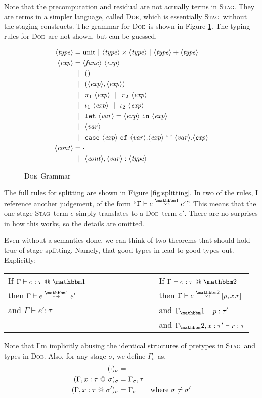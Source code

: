 \documentclass[11pt]{article}
\makeatletter
\newcommand {\type} {\langle\mathit{type}\rangle}
\newcommand {\expr} {\langle\mathit{exp}\rangle}
\newcommand {\var} {\langle\mathit{var}\rangle}
\newcommand {\context} {\langle\mathit{cont}\rangle}
\newcommand {\gbar} {~~|~~}
\newcommand {\bbone} {\mathbbm 1}
\newcommand {\bbtwo} {\mathbbm 2}
\newcommand {\at} {{\tt~@~}}
\newcommand {\letin} [3] {{\tt let}~{#1} = {#2}~{\tt in}~{#3}}
\newcommand {\splito} {\overset{\bbone}\rightsquigarrow}
\newcommand {\splits} {\overset{\bbtwo}\rightsquigarrow}
\newcommand {\wstage} {\textsc{Stag}}
\newcommand {\wostage} {\textsc{Doe}}
\makeatother
\begin{document}
Note that the precomputation and residual are not actually terms in \wstage.  They are terms in a simpler language, called \wostage, which is essentially \wstage~without the staging constructs.  The grammar for \wostage~is shown in Figure \ref{fig:gram2}.  The typing rules for \wostage~are not shown, but can be guessed.

\begin{figure}
\caption{\wostage~Grammar}
\label{fig:gram2}
\centering
\begin{align*}
\type &= \text{unit}~|~\type \times \type~|~\type + \type \\
\expr &= \langle\mathit{func}\rangle~\expr \\
&\gbar () \\
&\gbar (\expr, \expr) \\
&\gbar \pi_1~\expr 
\gbar \pi_2~\expr \\
&\gbar \iota_1~\expr 
\gbar \iota_2~\expr \\
&\gbar \letin {\var}{\expr}{\expr} \\
&\gbar \var \\
&\gbar {\tt case}~\expr~{\tt of}~\var.\expr~`{\tt |}\text{'}~\var.\expr \\
\context &= \cdot \\
&\gbar \context, \var : \type
\end{align*}
\end{figure}

The full rules for splitting are shown in Figure \ref{fig:splitting}.  In two of the rules, I reference another judgement, of the form ``$\Gamma \vdash e \splito e'$''.  This means that the one-stage \wstage~term $e$ simply translates to a \wostage~term $e'$.  There are no surprises in how this works, so the details are omitted.

Even without a semantics done, we can think of two theorems that should hold true of stage splitting.  Namely, that good types in lead to good types out.  Explicitly:

\begin{center}
\begin{tabular}{lll}
If $\Gamma \vdash e:\tau \at \bbone$ &~~~~~~~~~~~~~~ & If $\Gamma \vdash e:\tau \at \bbtwo$ \\
then $\Gamma \vdash e \splito e'$ && then $\Gamma \vdash e \splits [p,x.r]$ \\
and $\Gamma \vdash e':\tau$ && and $\Gamma_\bbone \vdash p:\tau'$\\
 && and $\Gamma_\bbtwo, x:\tau' \vdash r:\tau$
\end{tabular}
\end{center}
Note that I'm implicitly abusing the identical structures of pretypes in \wstage~and types in \wostage.  Also, for any stage $\sigma$, we define $\Gamma_\sigma$ as,
\begin{align}
(\cdot)_\sigma &= \cdot \\
(\Gamma,x:\tau\at\sigma)_\sigma &= \Gamma_\sigma, \tau \\
(\Gamma,x:\tau\at\sigma')_\sigma &= \Gamma_\sigma &\text{where } \sigma \not= \sigma'
\end{align}
\end{document}
